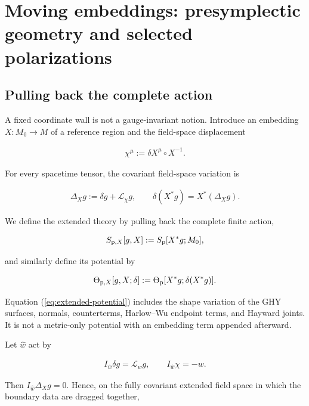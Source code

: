\section{Moving embeddings: presymplectic geometry and selected polarizations}\label{sec:moving-boundary}

\subsection{Pulling back the complete action}\label{subsec:pullback-action}

A fixed coordinate wall is not a gauge-invariant notion. Introduce an embedding $X:M_0\to M$ of a reference region and the field-space displacement

\begin{align}
\chi^\mu:=\delta X^\mu\circ X^{-1}.
\end{align}

For every spacetime tensor, the covariant field-space variation is

\begin{align}
\Delta_Xg:=\delta g+\mathcal L_\chi g,
\qquad
\delta(X^*g)=X^*(\Delta_Xg). \label{eq:delta-x}
\end{align}

We define the extended theory by pulling back the complete finite action,

\begin{align}
S_{{\rm p},X}[g,X]
:=S_{\rm p}[X^*g;M_0],
\end{align}

and similarly define its potential by

\begin{align}
\Theta_{{\rm p},X}[g,X;\delta]
:=\Theta_{\rm p}[X^*g;\delta(X^*g)]. \label{eq:extended-potential}
\end{align}

Equation (\ref{eq:extended-potential}) includes the shape variation of the GHY surfaces, normals, counterterms, Harlow--Wu endpoint terms, and Hayward joints. It is not a metric-only potential with an embedding term appended afterward.

Let $\widehat w$ act by

\begin{align}
I_{\widehat w}\delta g=\mathcal L_wg,
\qquad
I_{\widehat w}\chi=-w.
\end{align}

Then $I_{\widehat w}\Delta_Xg=0$. Hence, on the fully covariant extended field space in which the boundary data are dragged together,

